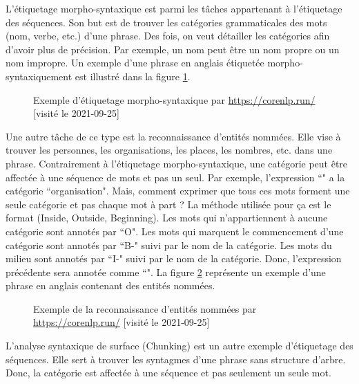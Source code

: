 \documentclass{KodeBook}
\begin{document}
L'étiquetage morpho-syntaxique est parmi les tâches appartenant à l'étiquetage des séquences. 
Son but est de trouver les catégories grammaticales des mots (nom, verbe, etc.) d'une phrase. 
Des fois, on veut détailler les catégories afin d'avoir plus de précision. 
Par exemple, un nom peut être un nom propre ou un nom impropre.
Un exemple d'une phrase en anglais étiquetée morpho-syntaxiquement est illustré dans la figure \ref{fig:ems-exp}.
\begin{figure}[ht]
	\centering
	\caption[Exemple d'étiquetage morpho-syntaxique]{Exemple d'étiquetage morpho-syntaxique par \url{https://corenlp.run/} [visité le 2021-09-25]\label{fig:ems-exp}}
\end{figure}

Une autre tâche de ce type est la reconnaissance d'entités nommées.
Elle vise à trouver les personnes, les organisations, les places, les nombres, etc. dans une phrase. 
Contrairement à l'étiquetage morpho-syntaxique, une catégorie peut être affectée à une séquence de mots et pas un seul. 
Par exemple, l'expression ``" a la catégorie ``organisation".
Mais, comment exprimer que tous ces mots forment une seule catégorie et pas chaque mot à part ?
La méthode utilisée pour ça est le format  (Inside, Outside, Beginning). 
Les mots qui n'appartiennent à aucune catégorie sont annotés par ``O". 
Les mots qui marquent le commencement d'une catégorie sont annotés par ``B-" suivi par le nom de la catégorie. 
Les mots du milieu sont annotés par ``I-" suivi par le nom de la catégorie. 
Donc, l'expression précédente sera annotée comme ``".
La figure \ref{fig:ner-exp} représente un exemple d'une phrase en anglais contenant des entités nommées.
\begin{figure}[ht]
	\centering
	\caption[Exemple de la reconnaissance d'entités nommées]{Exemple de la reconnaissance d'entités nommées par \url{https://corenlp.run/} [visité le 2021-09-25]\label{fig:ner-exp}}
\end{figure}

L'analyse syntaxique de surface (Chunking) est un autre exemple d'étiquetage des séquences.
Elle sert à trouver les syntagmes d'une phrase sans structure d'arbre. 
Donc, la catégorie est affectée à une séquence et pas seulement un seule mot.


\end{document}
